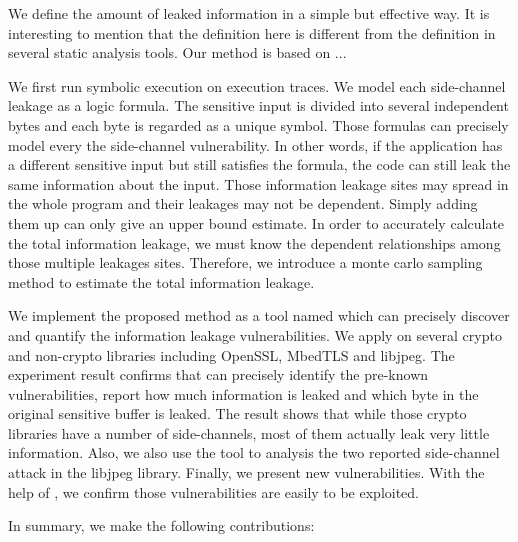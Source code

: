 We define the amount of leaked information in a simple but effective way. It is interesting to 
mention that the definition here is different from the definition in several static analysis 
tools.
Our method is based on ... 

We first run symbolic execution on execution traces. We model each side-channel leakage as a logic formula. 
The sensitive input is divided into several independent bytes and each byte is regarded as 
a unique symbol. Those formulas can precisely model every the side-channel vulnerability. 
In other words, if the application has a different sensitive input but still satisfies the formula, 
the code can still leak the same information about the input.  
Those information leakage sites may spread in the whole program 
and their leakages may not be dependent. Simply adding them up can only give an upper bound 
estimate. In order to accurately calculate the total information leakage, we must know the 
dependent relationships among those multiple leakages sites. Therefore, we introduce a 
monte carlo sampling method to estimate the total information leakage.

We implement the proposed method as a tool named \tool{} which can precisely discover and quantify the information
leakage vulnerabilities. We apply \tool{} on several crypto and non-crypto libraries including OpenSSL,
MbedTLS and libjpeg. The experiment result confirms that \tool{} can precisely identify the pre-known vulnerabilities,
report how much information is leaked and which byte in the original sensitive buffer is leaked. 
The result shows that while those crypto libraries have a number of side-channels, most of them actually
leak very little information. Also, we also use the tool to analysis the two reported side-channel attack 
in the libjpeg library. Finally, we present new vulnerabilities. With the help of \tool{}, we confirm those
vulnerabilities are easily to be exploited.

In summary, we make the following contributions:

